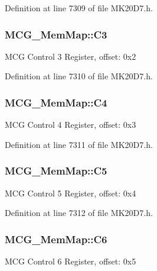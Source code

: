 Definition at line 7309 of file M\+K20\+D7.\+h.

\subsubsection[{\texorpdfstring{C3}{C3}}]{ M\+C\+G\+\_\+\+Mem\+Map\+::\+C3}\hypertarget{struct_m_c_g___mem_map_a58ca70b30279c98af3471abe38280f01}{}\label{struct_m_c_g___mem_map_a58ca70b30279c98af3471abe38280f01}
M\+CG Control 3 Register, offset\+: 0x2 

Definition at line 7310 of file M\+K20\+D7.\+h.

\subsubsection[{\texorpdfstring{C4}{C4}}]{ M\+C\+G\+\_\+\+Mem\+Map\+::\+C4}\hypertarget{struct_m_c_g___mem_map_a3c5615d70ed3f2d3664de1a8fdbe9983}{}\label{struct_m_c_g___mem_map_a3c5615d70ed3f2d3664de1a8fdbe9983}
M\+CG Control 4 Register, offset\+: 0x3 

Definition at line 7311 of file M\+K20\+D7.\+h.

\subsubsection[{\texorpdfstring{C5}{C5}}]{ M\+C\+G\+\_\+\+Mem\+Map\+::\+C5}\hypertarget{struct_m_c_g___mem_map_a0e385950fe0f38c82eae57eb4ea2aaf3}{}\label{struct_m_c_g___mem_map_a0e385950fe0f38c82eae57eb4ea2aaf3}
M\+CG Control 5 Register, offset\+: 0x4 

Definition at line 7312 of file M\+K20\+D7.\+h.

\subsubsection[{\texorpdfstring{C6}{C6}}]{ M\+C\+G\+\_\+\+Mem\+Map\+::\+C6}\hypertarget{struct_m_c_g___mem_map_ae7f9f9ae65de91e230a236ca4629380c}{}\label{struct_m_c_g___mem_map_ae7f9f9ae65de91e230a236ca4629380c}
M\+CG Control 6 Register, offset\+: 0x5 

